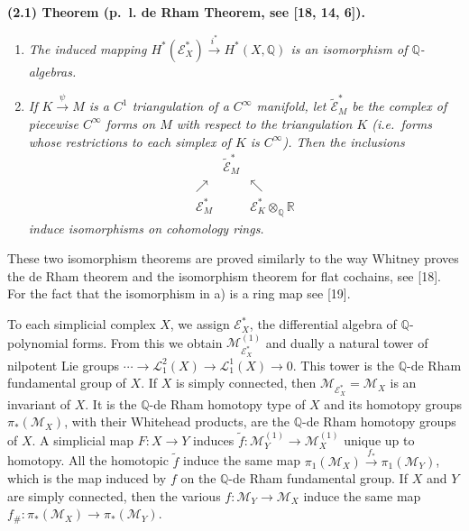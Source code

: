 \documentclass[
  english,
  a3paper,
  a3paper]{extarticle}
\begin{document}
\textbf{(2.1) Theorem (p.~l. de Rham Theorem, see {[}18, 14, 6{]}).}

\begin{enumerate}
\def\labelenumi{\alph{enumi})}
\item
  \emph{The induced mapping
  \(H^*(\mathscr E_X^*)\xrightarrow{i^*}H^*(X,\mathbb Q)\) is an
  isomorphism of \(\mathbb Q\)-algebras.}
\item
  \emph{If \(K\xrightarrow{\psi}M\) is a \(C^1\) triangulation of a
  \(C^\infty\) manifold, let \(\widetilde{\mathscr E}_M^*\) be the
  complex of piecewise \(C^\infty\) forms on \(M\) with respect to the
  triangulation \(K\) (i.e.~forms whose restrictions to each simplex of
  \(K\) is \(C^\infty\)). Then the inclusions} \[
  \begin{array}{ccc}
  &\widetilde{\mathscr E}_M^*&\\[-2mm]
  \nearrow&&\nwarrow\\[-2mm]
  \mathscr E_M^*&&\mathscr E_K^*\otimes_{\mathbb Q}\mathbb R
  \end{array}
  \] \emph{induce isomorphisms on cohomology rings.}
\end{enumerate}

These two isomorphism theorems are proved similarly to the way Whitney
proves the de Rham theorem and the isomorphism theorem for flat
cochains, see {[}18{]}. For the fact that the isomorphism in a) is a
ring map see {[}19{]}.

To each simplicial complex \(X\), we assign \(\mathscr E_X^*\), the
differential algebra of \(\mathbb Q\)-polynomial forms. From this we
obtain \(\mathcal M_{\mathscr E_X^*}^{(1)}\) and dually a natural tower
of nilpotent Lie groups
\(\cdots\to\mathcal L_1^2(X)\to\mathcal L_1^1(X)\to0\). This tower is
the \(\mathbb Q\)-de Rham fundamental group of \(X\). If \(X\) is simply
connected, then \(\mathcal M_{\mathscr E_X^*}=\mathcal M_X\) is an
invariant of \(X\). It is the \(\mathbb Q\)-de Rham homotopy type of
\(X\) and its homotopy groups \(\pi_*(\mathcal M_X)\), with their
Whitehead products, are the \(\mathbb Q\)-de Rham homotopy groups of
\(X\). A simplicial map \(F:X\to Y\) induces
\(\tilde f:\mathcal M_Y^{(1)}\to\mathcal M_X^{(1)}\) unique up to
homotopy. All the homotopic \(\tilde f\) induce the same map
\(\pi_1(\mathcal M_X)\xrightarrow{f_*}\pi_1(\mathcal M_Y)\), which is
the map induced by \(f\) on the \(\mathbb Q\)-de Rham fundamental group.
If \(X\) and \(Y\) are simply connected, then the various
\(f:\mathcal M_Y\to\mathcal M_X\) induce the same map
\(f_\#:\pi_*(\mathcal M_X)\to\pi_*(\mathcal M_Y)\).
\end{document}
